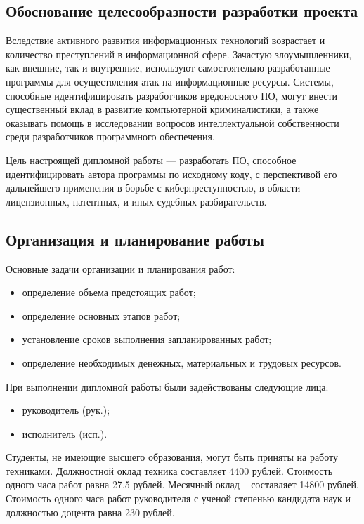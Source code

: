 \subsection{Обоснование целесообразности разработки проекта}

Вследствие активного развития информационных технологий возрастает и количество преступлений в информационной сфере.
Зачастую злоумышленники, как внешние, так и внутренние, используют самостоятельно разработанные программы для осуществления 
атак на информационные ресурсы.
Системы, способные идентифицировать разработчиков вредоносного ПО, могут внести существенный вклад в развитие компьютерной
криминалистики, а также оказывать помощь в исследовании вопросов интеллектуальной собственности среди разработчиков программного
обеспечения.

Цель настроящей дипломной работы --- разработать ПО, способное идентифицировать автора программы по исходному коду, с перспективой его
дальнейшего применения в борьбе с киберпреступностью, в области лицензионных, патентных, и иных судебных разбирательств.


\subsection{Организация и планирование работы}

Основные задачи организации и планирования работ:
\begin{itemize}
 \item определение объема предстоящих работ;
 \item определение основных этапов работ;
 \item установление сроков выполнения запланированных работ;
 \item определение необходимых денежных, материальных и трудовых ресурсов.
\end{itemize}


При выполнении дипломной работы были задействованы следующие лица:
\begin{itemize}
 \item руководитель (рук.);
 \item исполнитель (исп.).
\end{itemize}

Студенты, не имеющие высшего образования, могут быть приняты на
работу техниками. Должностной оклад техника составляет 4400 рублей.
Стоимость одного часа работ равна 27,5 рублей.
Месячный оклад ~\cite{rector_3106} составляет 14800 рублей.
Стоимость одного часа работ руководителя с ученой степенью кандидата наук и должностью доцента
равна 230 рублей.   

